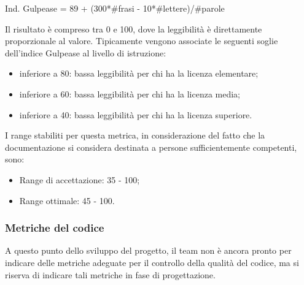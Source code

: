 			Ind. Gulpease = 89 + (300*#frasi - 10*#lettere)/#parole
			
		Il risultato è compreso tra 0 e 100, dove la leggibilità è direttamente proporzionale al valore.
		Tipicamente vengono associate le seguenti soglie dell'indice Gulpease al livello di istruzione:
		\begin{itemize}
			\item inferiore a 80: bassa leggibilità per chi ha la licenza elementare;
			\item inferiore a 60: bassa leggibilità per chi ha la licenza media;
			\item inferiore a 40: bassa leggibilità per chi ha la licenza superiore.
		\end{itemize}
		
		I range stabiliti per questa metrica, in considerazione del fatto che la documentazione si considera destinata a persone sufficientemente competenti, sono:
		\begin{itemize}
			\item Range di accettazione: 35 - 100;
			\item Range ottimale: 45 - 100.
		\end{itemize}
	\subsubsection{Metriche del codice}
		A questo punto dello sviluppo del progetto, il team non è ancora pronto per indicare delle metriche adeguate per il controllo della qualità del codice, ma si riserva di indicare tali metriche in fase di progettazione.